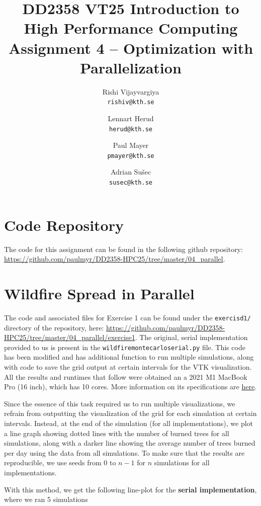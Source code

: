 \documentclass[a4paper,12pt]{article}
\title{
  \normalsize{DD2358 VT25 Introduction to}\\
  \normalsize{High Performance Computing}\\
  \large{Assignment 4 -- Optimization with Parallelization}\\
}
\author{
  \small Rishi Vijayvargiya\\[-0.75ex]
  \scriptsize\texttt{rishiv@kth.se}
  \and
  \small Lennart Herud\\[-0.75ex]
  \scriptsize\texttt{herud@kth.se}
  \and
  \small Paul Mayer\\[-0.75ex]
  \scriptsize\texttt{pmayer@kth.se}
  \and
  \small Adrian Sušec\\[-0.75ex]
  \scriptsize\texttt{susec@kth.se}
}
\date{}
\begin{document}
\maketitle
\thispagestyle{firstpagestyle}

\tableofcontents
\vspace{1em}

%

\section*{Code Repository}
The code for this assignment can be found in the following github repository: \url{https://github.com/paulmyr/DD2358-HPC25/tree/master/04_parallel}.

\section{Wildfire Spread in Parallel}
The code and associated files for Exercise 1 can be found under the \verb|exercisd1/| directory of the repository, here: \url{https://github.com/paulmyr/DD2358-HPC25/tree/master/04_parallel/exercise1}. The original, serial implementation provided to us is present in the \verb|wildfiremontecarloserial.py| file. This code has been modified and has additional function to run multiple simulations, along with code to save the grid output at certain intervals for the VTK visualization. All the results and runtimes that follow were obtained an a 2021 M1 MacBook Pro (16 inch), which has 10 cores. More information on its specifications are \href{https://support.apple.com/en-us/111901}{here}.

Since the essence of this task required us to run multiple visualizations, we refrain from outputting the visualization of the grid for each simulation at certain intervals. Instead, at the end of the simulation (for all implementations), we plot a line graph showing dotted lines with the number of burned trees for all simulations, along with a darker line showing the average number of trees burned per day using the data from all simulations. To make sure that the results are reproducible, we use seeds from 0 to $n-1$ for $n$ simulations for all implementations. 

With this method, we get the following line-plot for the \textbf{serial implementation}, where we ran 5 simulations
\end{document}
